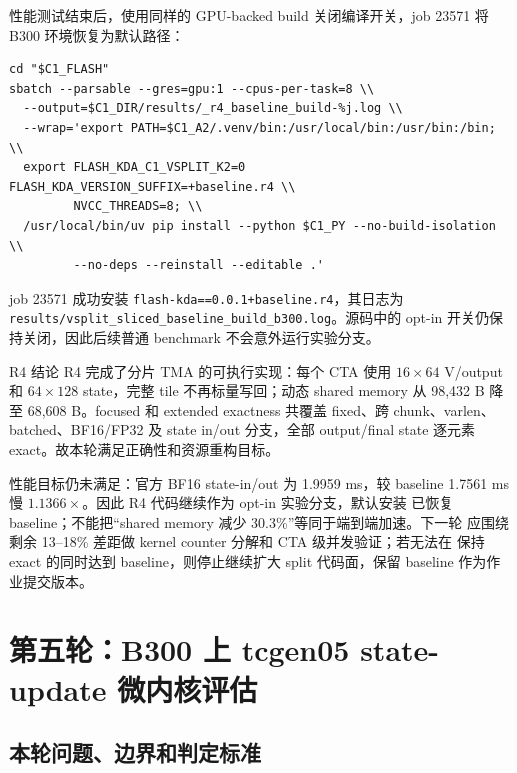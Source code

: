 \documentclass[11pt,a4paper,fontset=none]{ctexart}
\newcommand{\code}[1]{\texttt{#1}}
\begin{document}
性能测试结束后，使用同样的 GPU-backed build 关闭编译开关，job 23571 将 B300
环境恢复为默认路径：

\begin{lstlisting}
cd "$C1_FLASH"
sbatch --parsable --gres=gpu:1 --cpus-per-task=8 \\
  --output=$C1_DIR/results/_r4_baseline_build-%j.log \\
  --wrap='export PATH=$C1_A2/.venv/bin:/usr/local/bin:/usr/bin:/bin; \\
  export FLASH_KDA_C1_VSPLIT_K2=0 FLASH_KDA_VERSION_SUFFIX=+baseline.r4 \\
         NVCC_THREADS=8; \\
  /usr/local/bin/uv pip install --python $C1_PY --no-build-isolation \\
         --no-deps --reinstall --editable .'
\end{lstlisting}

job 23571 成功安装 \code{flash-kda==0.0.1+baseline.r4}，其日志为
\code{results/vsplit\_sliced\_baseline\_build\_b300.log}。源码中的 opt-in
开关仍保持关闭，因此后续普通 benchmark 不会意外运行实验分支。

\begin{record}{R4 结论}
R4 完成了分片 TMA 的可执行实现：每个 CTA 使用 \(16\times64\) V/output 和
\(64\times128\) state，完整 tile 不再标量写回；动态 shared memory 从
98,432 B 降至 68,608 B。focused 和 extended exactness 共覆盖 fixed、跨
chunk、varlen、batched、BF16/FP32 及 state in/out 分支，全部 output/final
state 逐元素 exact。故本轮满足正确性和资源重构目标。

性能目标仍未满足：官方 BF16 state-in/out 为 1.9959 ms，较 baseline
1.7561 ms 慢 \(1.1366\times\)。因此 R4 代码继续作为 opt-in 实验分支，默认安装
已恢复 baseline；不能把“shared memory 减少 30.3\%”等同于端到端加速。下一轮
应围绕剩余 13--18\% 差距做 kernel counter 分解和 CTA 级并发验证；若无法在
保持 exact 的同时达到 baseline，则停止继续扩大 split 代码面，保留 baseline
作为作业提交版本。
\end{record}

\section{第五轮：B300 上 tcgen05 state-update 微内核评估}

\subsection{本轮问题、边界和判定标准}
\end{document}
